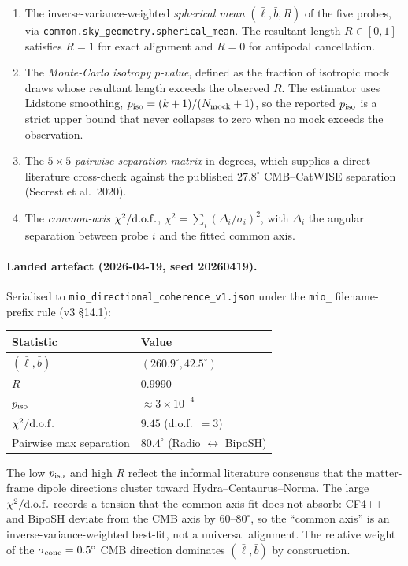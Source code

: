 \begin{enumerate}
\item The inverse-variance-weighted \emph{spherical mean}
  $(\bar\ell, \bar b, R)$ of the five probes, via
  \texttt{common.sky\_geometry.spherical\_mean}.  The
  resultant length $R \in [0, 1]$ satisfies $R=1$ for
  exact alignment and $R=0$ for antipodal cancellation.
\item The \emph{Monte-Carlo isotropy $p$-value}, defined as
  the fraction of isotropic mock draws whose resultant
  length exceeds the observed $R$.  The estimator uses
  Lidstone smoothing, $p_{\rm iso} = (k+1) / (N_{\rm mock}
  + 1)$, so the reported $p_{\rm iso}$ is a strict upper
  bound that never collapses to zero when no mock exceeds
  the observation.
\item The $5\times 5$ \emph{pairwise separation matrix} in
  degrees, which supplies a direct literature cross-check
  against the published $27.8^\circ$
  CMB--CatWISE separation (Secrest et al.\ 2020).
\item The \emph{common-axis $\chi^2/{\rm d.o.f.}$},
  $\chi^2 = \sum_i (\Delta_i / \sigma_i)^2$, with
  $\Delta_i$ the angular separation between probe $i$ and
  the fitted common axis.
\end{enumerate}

\paragraph{Landed artefact (2026-04-19, seed 20260419).}

Serialised to \texttt{mio\_directional\_coherence\_v1.json}
under the \texttt{mio\_} filename-prefix rule (v3 §14.1):

\begin{center}
\begin{tabular}{ll}
\hline\hline
Statistic & Value \\
\hline
$(\bar\ell, \bar b)$ & $(260.9^\circ, 42.5^\circ)$ \\
$R$ & $0.9990$ \\
$p_{\rm iso}$ & $\approx 3 \times 10^{-4}$ \\
$\chi^2 / {\rm d.o.f.}$ & $9.45$ (d.o.f.\ $= 3$) \\
Pairwise max separation & $80.4^\circ$ (Radio $\leftrightarrow$ BipoSH) \\
\hline\hline
\end{tabular}
\end{center}

The low $p_{\rm iso}$ and high $R$ reflect the informal
literature consensus that the matter-frame dipole
directions cluster toward Hydra--Centaurus--Norma.  The
large $\chi^2/{\rm d.o.f.}$ records a tension that the
common-axis fit does not absorb: CF4++ and BipoSH deviate
from the CMB axis by $60\text{--}80^\circ$, so the
``common axis'' is an inverse-variance-weighted best-fit,
not a universal alignment.  The relative weight of the
$\sigma_{\rm cone}=0.5^\circ$ CMB direction dominates
$(\bar\ell, \bar b)$ by construction.


